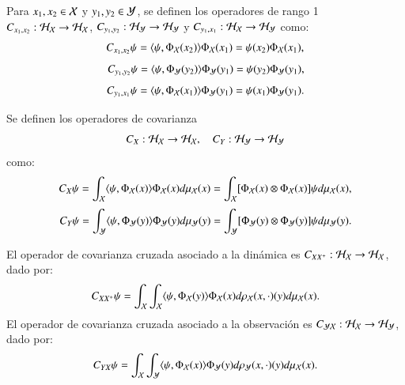 \begin{defn}
	Para $x_1, x_2 \in \mathcal{X}$ y $y_1, y_2 \in \mathcal{Y}$, se definen los operadores de rango 1 $C_{x_1,x_2} : \mathcal{H}_{\mathcal{X}} \to \mathcal{H}_{\mathcal{X}}$, $C_{y_1,y_2} : \mathcal{H}_{\mathcal{Y}} \to \mathcal{H}_{\mathcal{Y}}$ y $C_{y_1,x_1} : \mathcal{H}_{\mathcal{X}} \to \mathcal{H}_{\mathcal{Y}}$ como:
	\begin{equation*}
		C_{x_1, x_2} \psi = \langle \psi, \Phi_{\mathcal{X}} (x_2) \rangle \Phi_{\mathcal{X}} (x_1) = \psi (x_2) \Phi_{\mathcal{X}} (x_1),
	\end{equation*}
	\begin{equation*}
		C_{y_1, y_2} \psi = \langle \psi, \Phi_{\mathcal{Y}} (y_2) \rangle \Phi_{\mathcal{Y}} (y_1) = \psi (y_2) \Phi_{\mathcal{Y}} (y_1),
	\end{equation*}
	\begin{equation*}
		C_{y_1, x_1} \psi = \langle \psi, \Phi_{\mathcal{X}} (x_1) \rangle \Phi_{\mathcal{Y}} (y_1) = \psi (x_1) \Phi_{\mathcal{Y}} (y_1).
	\end{equation*}
\end{defn}

\begin{defn}
	Se definen los operadores de covarianza 
    \begin{equation*}
        C_X : \mathcal{H}_{\mathcal{X}} \to \mathcal{H}_{\mathcal{X}}, \quad C_Y : \mathcal{H}_{\mathcal{Y}} \to \mathcal{H}_{\mathcal{Y}}
    \end{equation*} 
    como:
	\begin{equation*}
		C_X \psi = \int_{\mathcal{X}} \langle \psi, \Phi_{\mathcal{X}} (x) \rangle \Phi_{\mathcal{X}} (x) d \mu_{\mathcal{X}} (x) = \int_{\mathcal{X}} [\Phi_{\mathcal{X}} (x) \otimes \Phi_{\mathcal{X}} (x)] \psi d \mu_{\mathcal{X}} (x),
	\end{equation*}
	\begin{equation*}
		C_Y \psi = \int_{\mathcal{Y}} \langle \psi, \Phi_{\mathcal{Y}} (y) \rangle \Phi_{\mathcal{Y}} (y) d \mu_{\mathcal{Y}} (y) = \int_{\mathcal{Y}} [\Phi_{\mathcal{Y}} (y) \otimes \Phi_{\mathcal{Y}} (y)] \psi d \mu_{\mathcal{Y}} (y).
	\end{equation*}
\end{defn}

\begin{defn}
	El operador de covarianza cruzada asociado a la dinámica es $C_{X X^+} : \mathcal{H}_{\mathcal{X}} \to \mathcal{H}_{\mathcal{X}}$, dado por:
	\begin{equation*}
		C_{X X^+} \psi = \int_{\mathcal{X}} \int_{\mathcal{X}} \langle \psi, \Phi_{\mathcal{X}} (y) \rangle \Phi_{\mathcal{X}} (x) d\rho_{\mathcal{X}} (x, \cdot)(y) d \mu_{\mathcal{X}} (x).
	\end{equation*}
	El operador de covarianza cruzada asociado a la observación es $C_{\mathcal{Y} \mathcal{X}} : \mathcal{H}_{\mathcal{X}} \to \mathcal{H}_{\mathcal{Y}}$, dado por:
	\begin{equation*}
		C_{Y X} \psi = \int_{\mathcal{X}} \int_{\mathcal{Y}} \langle \psi, \Phi_{\mathcal{X}} (x) \rangle \Phi_{\mathcal{Y}} (y) d\rho_{\mathcal{Y}} (x, \cdot)(y) d \mu_{\mathcal{X}} (x).
	\end{equation*}
\end{defn}

